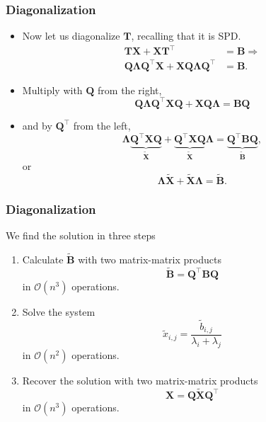 \begin{frame}
  \frametitle{Diagonalization}
  \begin{itemize}
  \item Now let us diagonalize $\bm T$, recalling that it is SPD.
    \begin{align*}
      \bm T \bm X + \bm X \bm T^\intercal &= \bm B \Rightarrow \\
      \bm Q \bm \Lambda \bm Q^\intercal \bm X + \bm X \bm Q \bm \Lambda \bm Q^\intercal &= \bm B.
    \end{align*}
  \item Multiply with $\bm Q$ from the right,
    \[
      \bm Q \bm \Lambda \bm Q^\intercal \bm X \bm Q + \bm X \bm Q \bm \Lambda
      = \bm B \bm Q
    \]
  \item and by $\bm Q^\intercal$ from the left,
    \[
      \bm \Lambda \underbrace{\bm Q^\intercal \bm X \bm Q}_{\tilde{\bm X}} +
      \underbrace{\bm Q^\intercal \bm X \bm Q}_{\tilde{\bm X}} \bm \Lambda =
      \underbrace{\bm Q^\intercal \bm B \bm Q}_{\tilde{\bm B}},
    \]
    or
    \[
      \bm \Lambda \tilde{\bm X} + \tilde{\bm X} \bm \Lambda = \tilde{\bm B}.
    \]
  \end{itemize}
\end{frame}

\begin{frame}
  \frametitle{Diagonalization}
  We find the solution in three steps
  \begin{enumerate}
  \item Calculate $\tilde{\bm B}$ with two matrix-matrix products
    \[ \tilde{\bm B} = \bm Q^\intercal \bm B \bm Q \]
    in $\mathcal{O}(n^3)$ operations.
  \item Solve the system
    \[ \tilde{x}_{i,j} = \frac{\tilde{b}_{i,j}}{\lambda_i + \lambda_j} \]
    in $\mathcal{O}(n^2)$ operations.
  \item Recover the solution with two matrix-matrix products\
    \[ \bm X = \bm Q \tilde{\bm X} \bm Q^\intercal \]
    in $\mathcal{O}(n^3)$ operations.
  \end{enumerate}
\end{frame}

